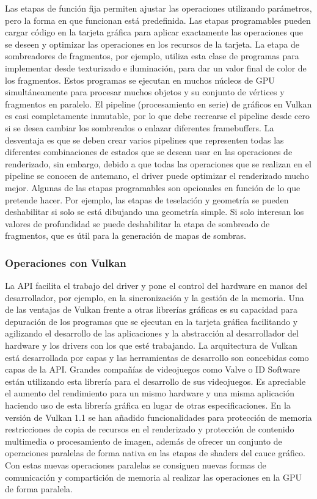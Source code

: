 \documentclass[a4paper, 17pt]{book}
\begin{document}
Las etapas de función fija permiten ajustar las operaciones utilizando parámetros, pero la forma en que funcionan está predefinida.
Las etapas programables pueden cargar código en la tarjeta gráfica para aplicar exactamente las operaciones que se deseen y
optimizar las operaciones en los recursos de la tarjeta.  La etapa de sombreadores de fragmentos, por ejemplo, utiliza esta
clase de programas para implementar desde texturizado e iluminación, para dar un valor final de color de los fragmentos.
Estos programas se ejecutan en muchos núcleos de GPU simultáneamente para procesar muchos objetos y su conjunto de vértices
y fragmentos en paralelo.
\bigbreak
El pipeline (procesamiento en serie) de gráficos en Vulkan es casi completamente inmutable, por lo que debe recrearse el
pipeline desde cero si se desea cambiar los sombreados o enlazar diferentes framebuffers. La desventaja es que se deben
crear varios pipelines que representen todas las diferentes combinaciones de estados que se desean usar en las operaciones
de renderizado, sin embargo, debido a que todas las operaciones que se realizan en el pipeline se conocen de antemano,
el driver puede optimizar el renderizado mucho mejor.
\bigbreak
Algunas de las etapas programables son opcionales en función de lo que pretende hacer. Por ejemplo, las etapas de
teselación y geometría se pueden deshabilitar si solo se está dibujando una geometría simple. Si solo interesan
los valores de profundidad se puede deshabilitar la etapa de sombreado de fragmentos, que es útil para la generación
de mapas de sombras.

\subsubsection{Operaciones con Vulkan} 
\label{subsubsec:OpVulkan}

La API facilita el trabajo del driver y pone el control del hardware en manos del desarrollador, por ejemplo,
en la sincronización y la gestión de la memoria. Una de las ventajas de Vulkan frente a otras librerías gráficas
es su capacidad para depuración de los programas que se ejecutan en la tarjeta gráfica facilitando y agilizando
el desarrollo de las aplicaciones y la abstracción al desarrollador del hardware y los drivers con los que esté
trabajando. La arquitectura de Vulkan está desarrollada por capas y las herramientas de desarrollo son concebidas
como capas de la API. Grandes compañías de videojuegos como Valve o ID Software están utilizando esta librería
para el desarrollo de sus videojuegos. Es apreciable el aumento del rendimiento para un mismo hardware y una misma
aplicación haciendo uso de esta librería gráfica en lugar de otras especificaciones. 
\bigbreak
En la versión de Vulkan 1.1 se han añadido funcionalidades para protección de memoria restricciones de copia de
recursos en el renderizado y protección de contenido multimedia o procesamiento de imagen, además de ofrecer
un conjunto de operaciones paralelas de forma nativa en las etapas de shaders del cauce gráfico. Con estas nuevas
operaciones paralelas se consiguen nuevas formas de comunicación y compartición de memoria al realizar las operaciones
en la GPU de forma paralela.
\end{document}
